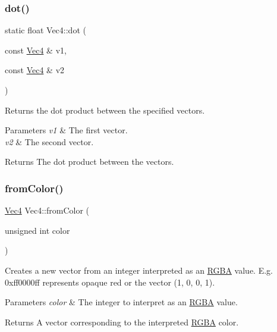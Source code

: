 \subsubsection{\texorpdfstring{dot()}{dot()}\hspace{0.1cm}{\footnotesize\ttfamily [4/4]}}
{\footnotesize\ttfamily static float Vec4\+::dot (\begin{DoxyParamCaption}\item[{const \hyperlink{classVec4}{Vec4} \&}]{v1,  }\item[{const \hyperlink{classVec4}{Vec4} \&}]{v2 }\end{DoxyParamCaption})\hspace{0.3cm}{\ttfamily [static]}}

Returns the dot product between the specified vectors.


\begin{DoxyParams}{Parameters}
{\em v1} & The first vector. \\
\hline
{\em v2} & The second vector.\\
\hline
\end{DoxyParams}
\begin{DoxyReturn}{Returns}
The dot product between the vectors. 
\end{DoxyReturn}
\mbox{\label{classVec4_aa13cf3fb8849cfce32630bc182f968a7}} 
\subsubsection{\texorpdfstring{from\+Color()}{fromColor()}\hspace{0.1cm}{\footnotesize\ttfamily [1/2]}}
{\footnotesize\ttfamily \hyperlink{classVec4}{Vec4} Vec4\+::from\+Color (\begin{DoxyParamCaption}\item[{unsigned int}]{color }\end{DoxyParamCaption})\hspace{0.3cm}{\ttfamily [static]}}

Creates a new vector from an integer interpreted as an \hyperlink{structRGBA}{R\+G\+BA} value. E.\+g. 0xff0000ff represents opaque red or the vector (1, 0, 0, 1).


\begin{DoxyParams}{Parameters}
{\em color} & The integer to interpret as an \hyperlink{structRGBA}{R\+G\+BA} value.\\
\hline
\end{DoxyParams}
\begin{DoxyReturn}{Returns}
A vector corresponding to the interpreted \hyperlink{structRGBA}{R\+G\+BA} color. 
\end{DoxyReturn}
\mbox{\label{classVec4_a0c7fecd1d84722314be6bb090eb6e7fa}} 
